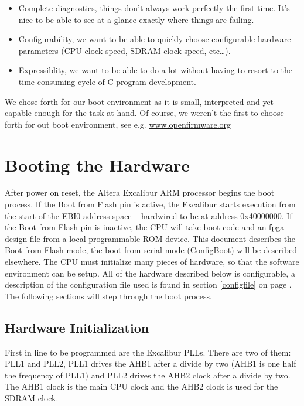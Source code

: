 \documentclass{article}
\begin{document}
\begin{itemize}
\item Complete diagnostics, things don't always work
perfectly the first time.  It's nice to be able to
see at a glance exactly where things are failing.
\item Configurability, we want to be able to quickly
choose configurable hardware parameters (CPU clock speed,
SDRAM clock speed, etc\ldots).
\item Expressiblity, we want to be able to do a lot without
having to resort to the time-consuming cycle
of C program development.
\end{itemize}

We chose forth for our boot environment as it is small, 
interpreted and yet capable enough for the task at hand.
Of course, we weren't the first to choose forth for out
boot environment, see e.g. \url{www.openfirmware.org}

\section{Booting the Hardware}

After power on reset, the Altera Excalibur ARM processor
begins the boot process.  If the Boot from
Flash  pin is active,
the Excalibur starts execution from the start
of the EBI0 address space -- hardwired to be
at address 0x40000000.  If the Boot from Flash
pin is inactive, the CPU will take boot code
and an fpga design file from a local programmable
ROM device.  This document describes the Boot
from Flash mode, the boot from serial mode (ConfigBoot) will
be described elsewhere.
The CPU must initialize
many pieces of hardware, so that the software
environment can be setup. All of the hardware described below
is configurable, a description of the configuration file used
is found in section \ref{configfile}
on page \pageref{configfile}.  The following
sections will step through the boot process.

        \subsection{Hardware Initialization}

First in line to be programmed are the Excalibur PLLs.
There are two of them:  PLL1  and 
PLL2,
PLL1 drives the AHB1  after a divide by two (AHB1 is
one half the frequency of PLL1) and PLL2 drives the AHB2 
clock after
a divide by two.  The AHB1 clock is the main CPU clock and the
AHB2 clock is used for the SDRAM clock.
\end{document}
